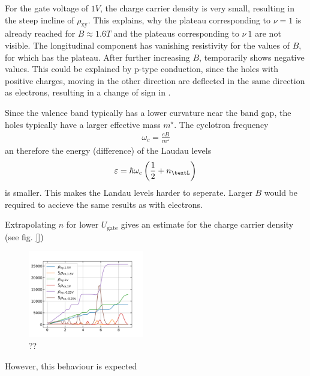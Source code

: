 For the gate voltage of $1V$, the charge carrier density is very small, resulting in the steep incline of $\rho_\text{xy}$.
This explains, why the plateau corresponding to $\nu=1$ is already reached for $B\approx1.6T$ and 
the plateaus corresponding to  $\nu\>1$ are not visible.
The longitudinal component has vanishing resistivity for the values of $B$, for which \rhall has the plateau.  
After further increasing $B$, \rhall temporarily shows negative values.
This could be explained by p-type conduction, since the holes with positive charges, 
moving in the other direction are deflected in the same direction as electrons, resulting in a change of sign in \rhall.





Since the valence band typically has a lower curvature near the band gap, the holes typically have a larger effective mass $m^\star$.
The cyclotron frequency
\begin{align}
    \omega_c = \frac{eB}{m^\star}    
\end{align}
an therefore the energy (difference) of the Laudau levels
\begin{align}
    \varepsilon = \hbar \omega_c \left(\frac{1}{2} + n_\textL \right)    
\end{align}
is smaller.
This makes the Landau levels harder to seperate. 
Larger $B$ would be required to accieve the same results as with electrons.








Extrapolating $n$ for lower $U_\text{gate}$ gives an estimate for the charge carrier density (see fig. \ref{})
\begin{figure}[h]
    \centering
    \includegraphics[width=0.45\textwidth]{../Images/differentGateVoltagesQHE.png}
    \caption{??}
    \label{fig:differentGateVoltagesQHE}
\end{figure}




However, this behaviour is expected     


